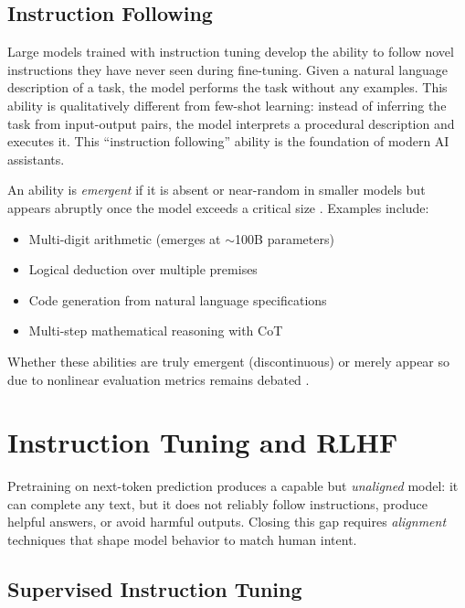 \subsection{Instruction Following}

Large models trained with instruction tuning develop the ability to follow novel instructions they have never seen during fine-tuning. Given a natural language description of a task, the model performs the task without any examples. This ability is qualitatively different from few-shot learning: instead of inferring the task from input-output pairs, the model interprets a procedural description and executes it. This ``instruction following'' ability is the foundation of modern AI assistants.

\begin{dogmadef}
An ability is \emph{emergent} if it is absent or near-random in smaller models but appears abruptly once the model exceeds a critical size \citep{wei2022}. Examples include:
\begin{itemize}[leftmargin=1.5em]
  \item Multi-digit arithmetic (emerges at $\sim$100B parameters)
  \item Logical deduction over multiple premises
  \item Code generation from natural language specifications
  \item Multi-step mathematical reasoning with CoT
\end{itemize}
Whether these abilities are truly emergent (discontinuous) or merely appear so due to nonlinear evaluation metrics remains debated \citep{schaeffer2023}.
\end{dogmadef}

\section{Instruction Tuning and RLHF}
\label{sec:rlhf}

Pretraining on next-token prediction produces a capable but \emph{unaligned} model: it can complete any text, but it does not reliably follow instructions, produce helpful answers, or avoid harmful outputs. Closing this gap requires \emph{alignment} techniques that shape model behavior to match human intent.

\subsection{Supervised Instruction Tuning}

